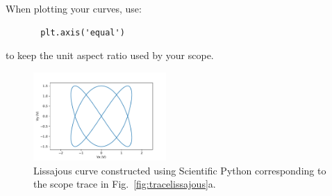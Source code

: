 When plotting your curves, use:
\begin{verbatim}
       plt.axis('equal')
\end{verbatim}
to keep the unit aspect ratio used by your scope.
%

\begin{figure}[htbp]
\begin{center}
\includegraphics[width=0.45\textwidth]{figs/labs/lissajous/pythonlissajous.pdf} 
\caption{Lissajous curve constructed using Scientific Python corresponding to the scope trace in Fig.~\ref{fig:tracelissajous}a.}
\label{fig:pythonlissajous}
\end{center}
\end{figure}
